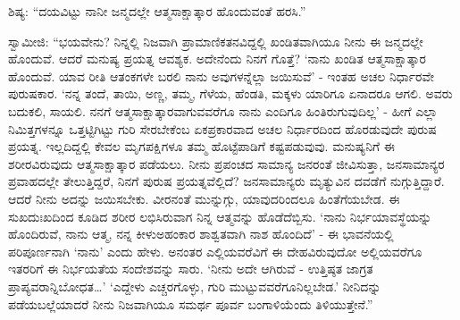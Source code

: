  ಶಿಷ್ಯ: “ದಯವಿಟ್ಟು ನಾನೀ ಜನ್ಮದಲ್ಲೇ ಆತ್ಮಸಾಕ್ಷಾತ್ಕಾರ ಹೊಂದುವಂತೆ ಹರಸಿ.” 

 ಸ್ವಾಮೀಜಿ: “ಭಯವೇನು? ನಿನ್ನಲ್ಲಿ ನಿಜವಾಗಿ ಪ್ರಾಮಾಣಿಕತನವಿದ್ದಲ್ಲಿ ಖಂಡಿತವಾಗಿಯೂ ನೀನು ಈ ಜನ್ಮದಲ್ಲೇ ಹೊಂದುವೆ. ಆದರೆ ಮನುಷ್ಯ ಪ್ರಯತ್ನ ಆವಶ್ಯಕ. ಅದೇನೆಂದು ನಿನಗೆ ಗೊತ್ತೆ? ‘ನಾನು ಖಂಡಿತ ಆತ್ಮಸಾಕ್ಷಾತ್ಕಾರ ಹೊಂದುವೆ. ಯಾವ ರೀತಿ ಆತಂಕಗಳೇ ಬರಲಿ ನಾನು ಅವುಗಳನ್ನೆಲ್ಲಾ ಜಯಿಸುವೆ’ - ಇಂತಹ ಅಚಲ ನಿರ್ಧಾರವೇ ಪುರುಷಕಾರ. ‘ನನ್ನ ತಂದೆ, ತಾಯಿ, ಅಣ್ಣ, ತಮ್ಮ, ಗೆಳೆಯ, ಹೆಂಡತಿ, ಮಕ್ಕಳು ಯಾರಿಗೂ ಏನಾದರೂ ಆಗಲಿ. ಅವರು ಬದುಕಲಿ, ಸಾಯಲಿ. ನನಗೆ ಆತ್ಮಸಾಕ್ಷಾತ್ಕಾರವಾಗುವವರೆಗೂ ನಾನು ಎಂದಿಗೂ ಹಿಂತಿರುಗುವುದಿಲ್ಲ’ - ಹೀಗೆ ಎಲ್ಲಾ ನಿಮಿತ್ತಗಳನ್ನೂ ಒತ್ತಟ್ಟಿಗಿಟ್ಟು ಗುರಿ ಸೇರಬೇಕೆಂಬ ಏಕಪ್ರಕಾರವಾದ ಅಚಲ ನಿರ್ಧಾರದಿಂದ ಹೊರಡುವುದೇ ಪುರುಷ ಪ್ರಯತ್ನ. ಇಲ್ಲದಿದ್ದಲ್ಲಿ ಕೇವಲ ಮೃಗಪಕ್ಷಿಗಳೂ ತಮ್ಮ ಹೊಟ್ಟೆಪಾಡಿಗೆ ಕಷ್ಟಪಡುವುವು. ಮನುಷ್ಯನಿಗೆ ಈ ಶರೀರವಿರುವುದು ಆತ್ಮಸಾಕ್ಷಾತ್ಕಾರ ಪಡೆಯಲು. ನೀನು ಪ್ರಪಂಚದ ಸಾಮಾನ್ಯ ಜನರಂತೆ ಜೀವಿಸುತ್ತಾ, ಜನಸಾಮಾನ್ಯರ ಪ್ರವಾಹದಲ್ಲೇ ತೇಲುತ್ತಿದ್ದರೆ, ನಿನಗೆ ಪುರುಷ ಪ್ರಯತ್ನವೆಲ್ಲಿದೆ? ಜನಸಾಮಾನ್ಯರು ಮೃತ್ಯುವಿನ ದವಡೆಗೆ ನುಗ್ಗುತ್ತಿದ್ದಾರೆ. ಆದರೆ ನೀನು ಅದನ್ನು ಜಯಿಸಬೇಕು. ವೀರನಂತೆ ಮುನ್ನುಗ್ಗು, ಯಾವುದರಿಂದಲೂ ಹಿಂತೆಗೆಯಬೇಡ. ಈ ಸುಖದುಃಖದಿಂದ ಕೂಡಿದ ಶರೀರ ಲಭಿಸಿರುವಾಗ ನಿನ್ನ ಆತ್ಮವನ್ನು ಹೊಡೆದೆಬ್ಬಿಸು. ‘ನಾನು ನಿರ್ಭಯಾವಸ್ಥೆಯನ್ನು ಹೊಂದಿರುವೆ, ನಾನು ಆತ್ಮ, ನನ್ನ ಕೀಳುಅಹಂಕಾರ ಶಾಶ್ವತವಾಗಿ ನಾಶ ಹೊಂದಿದೆ’ - ಈ ಭಾವನೆಯಲ್ಲಿ ಪರಿಪೂರ್ಣನಾಗಿ ‘ನಾನು’ ಎಂದು ಹೇಳು. ಅನಂತರ ಎಲ್ಲಿಯವರೆವಿಗೆ ಈ ದೇಹವಿರುವುದೋ ಅಲ್ಲಿಯವರೆಗೂ ಇತರರಿಗೆ ಈ ನಿರ್ಭಯತೆಯ ಸಂದೇಶವನ್ನು ಸಾರು. ‘ನೀನು ಅದೇ ಆಗಿರುವೆ - ಉತ್ತಿಷ್ಠತ ಜಾಗ್ರತ ಪ್ರಾಪ್ಯವರಾನ್ನಿಬೋಧತ…’ ‘ಎದ್ದೇಳು ಎಚ್ಚರಗೊಳ್ಳು, ಗುರಿ ಮುಟ್ಟುವವರೆಗೂ‌ನಿಲ್ಲಬೇಡ.’ ನೀನಿದನ್ನು ಪಡೆಯಬಲ್ಲೆಯಾದರೆ ನೀನು ನಿಜವಾಗಿಯೂ ಸಮರ್ಥ ಪೂರ್ವ ಬಂಗಾಳಿಯೆಂದು ತಿಳಿಯುತ್ತೇನೆ.” 

